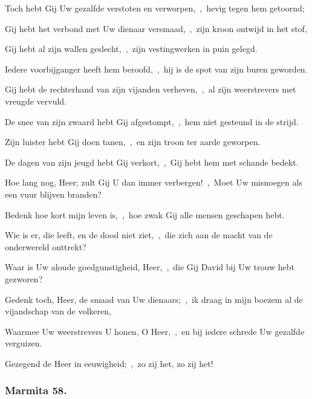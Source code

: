 \documentclass[12pt,twoside,a5paper]{article}
\begin{document}
\begin{halfparskip}

  Toch hebt Gij Uw gezalfde verstoten en verworpen,~\sep\ hevig tegen hem getoornd;

  Gij hebt het verbond met Uw dienaar versmaad,~\sep\ zijn kroon ontwijd in het stof,

  Gij hebt al zijn wallen geslecht,~\sep\ zijn vestingwerken in puin gelegd.

  Iedere voorbijganger heeft hem beroofd,~\sep\ hij is de spot van zijn buren geworden.

  Gij hebt de rechterhand van zijn vijanden verheven,~\sep\ al zijn weerstrevers met vreugde vervuld.

  De snee van zijn zwaard hebt Gij afgestompt,~\sep\ hem niet gesteund in de strijd.

  Zijn luister hebt Gij doen tanen,~\sep\ en zijn troon ter aarde geworpen.

  De dagen van zijn jeugd hebt Gij verkort,~\sep\ Gij hebt hem met schande bedekt.
\end{halfparskip}

\begin{halfparskip}

  Hoe lang nog, Heer; zult Gij U dan immer verbergen!~\sep\ Moet Uw misnoegen als een vuur blijven branden?

  Bedenk hoe kort mijn leven is,~\sep\ hoe zwak Gij alle mensen geschapen hebt.

  Wie is er, die leeft, en de dood niet ziet,~\sep\ die zich aan de macht van de onderwereld onttrekt?

  Waar is Uw aloude goedgunstigheid, Heer,~\sep\ die Gij David bij Uw trouw hebt gezworen?

  Gedenk toch, Heer, de smaad van Uw dienaars;~\sep\ ik draag in mijn boezem al de vijandschap van de volkeren,

  Waarmee Uw weerstrevers U honen, O Heer,~\sep\ en bij iedere schrede Uw gezalfde verguizen.

  Gezegend de Heer in eeuwigheid;~\sep\ zo zij het, zo zij het!
\end{halfparskip}


\subsubsection*{Marmita 58. \nopagebreak}
\end{document}
